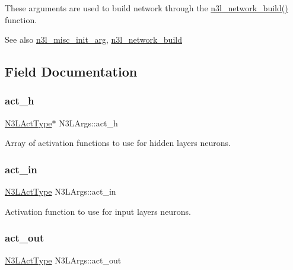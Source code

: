 These arguments are used to build network through the \hyperlink{n3__network_8c_a5f87e1efebd658dd55d7d2ca1768bdba}{n3l\+\_\+network\+\_\+build()} function.

\begin{DoxySeeAlso}{See also}
\hyperlink{n3__misc_8c_a22f4dc2ca9ee867a30c91565e37788d9}{n3l\+\_\+misc\+\_\+init\+\_\+arg}, \hyperlink{n3__network_8c_a5f87e1efebd658dd55d7d2ca1768bdba}{n3l\+\_\+network\+\_\+build} 
\end{DoxySeeAlso}


\subsection{Field Documentation}
\mbox{\label{structN3LArgs_a968aa1ed194fc7bbfaac154bcbf8a405}} 
\subsubsection{\texorpdfstring{act\+\_\+h}{act\_h}}
{\footnotesize\ttfamily \hyperlink{n3__header_8h_a3118e8995213ca26bd388c3d94cd8056}{N3\+L\+Act\+Type}$\ast$ N3\+L\+Args\+::act\+\_\+h}

Array of activation functions to use for hidden layer\textquotesingle{}s neurons. \mbox{\label{structN3LArgs_abb810a671b7a1b20c161e81e309f843c}} 
\subsubsection{\texorpdfstring{act\+\_\+in}{act\_in}}
{\footnotesize\ttfamily \hyperlink{n3__header_8h_a3118e8995213ca26bd388c3d94cd8056}{N3\+L\+Act\+Type} N3\+L\+Args\+::act\+\_\+in}

Activation function to use for input layer\textquotesingle{}s neurons. \mbox{\label{structN3LArgs_ad9d17026b32668acea535143809b16c5}} 
\subsubsection{\texorpdfstring{act\+\_\+out}{act\_out}}
{\footnotesize\ttfamily \hyperlink{n3__header_8h_a3118e8995213ca26bd388c3d94cd8056}{N3\+L\+Act\+Type} N3\+L\+Args\+::act\+\_\+out}

